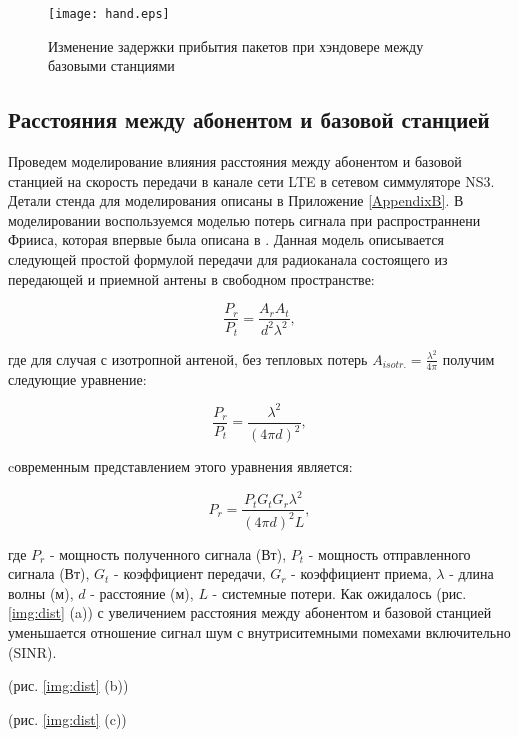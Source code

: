 \begin{figure} [h]
  \center
\texttt{[image: hand.eps]}
  \caption{Изменение задержки прибытия пакетов при хэндовере между базовыми станциями}
  \label{img:hand}
\end{figure}

\subsection{Расстояния между абонентом и базовой станцией}  \label{sect2_2_2}
Проведем моделирование влияния расстояния между абонентом и базовой станцией на скорость передачи в канале сети LTE в сетевом симмуляторе NS3. Детали стенда для моделирования описаны в Приложение \ref{AppendixB}. В моделировании воспользуемся моделью потерь сигнала при распространнени Фрииса, которая впервые была описана в \cite{Friis}. Данная модель описывается следующей простой формулой передачи для радиоканала состоящего из передающей и приемной антены в свободном пространстве:

\begin{equation}\label{eq:friisMod1}
\frac{P_{r}}{P_{t}}=\frac{A_{r}A_{t}}{d^{2}\lambda^{2}},
\end{equation}

\noindent где для случая с изотропной антеной, без тепловых потерь $A_{isotr.}=\frac{\lambda^{2}}{4\pi}$ получим следующие уравнение:

\begin{equation}\label{eq:friisMod2}
\frac{P_{r}}{P_{t}}=\frac{\lambda^{2}}{(4\pi d)^{2}},
\end{equation}

\noindent cовременным представлением этого уравнения является:

\begin{equation}\label{eq:friisNew}
P_{r}=\frac{P_{t}G_{t}G_{r}\lambda^{2}}{(4\pi d)^{2}L},
\end{equation}

\noindent где $P_{r}$ - мощность полученного сигнала (Вт), $P_{t}$ - мощность отправленного сигнала (Вт), $G_{t}$ - коэффициент передачи, $G_{r}$ - коэффициент приема, $\lambda$ - длина волны (м), $d$ - расстояние (м), $L$ - системные потери. Как ожидалось (рис. \ref{img:dist} (a)) с увеличением расстояния между абонентом и базовой станцией уменьшается отношение сигнал шум с внутриситемными помехами включительно (SINR).

(рис. \ref{img:dist} (b))

(рис. \ref{img:dist} (c))

